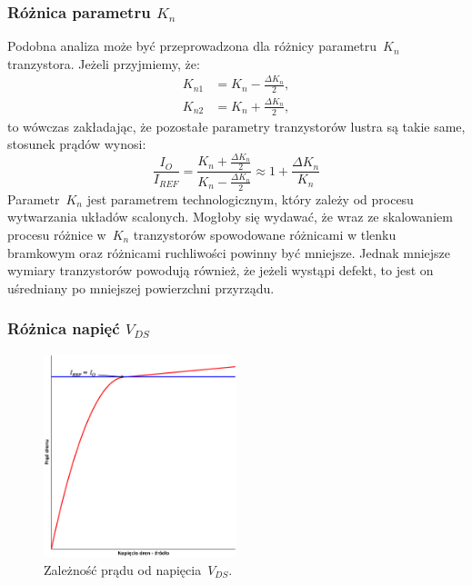 \documentclass[twoside,pl,final]{labman}
\begin{document}
\subsubsection{Różnica parametru $K_n$}
\label{baisc:matching:kp}
Podobna analiza może być przeprowadzona dla różnicy parametru~$K_n$ tranzystora.
Jeżeli przyjmiemy, że:
\begin{align}
  K_{n1} &= K_n - \frac{\Delta K_n}{2}, \nonumber \\
  K_{n2} &= K_n + \frac{\Delta K_n}{2},
\end{align}
to wówczas zakładając, że pozostałe parametry tranzystorów lustra
są takie same, stosunek prądów wynosi:
\begin{equation}
  \frac{I_O}{I_{REF}} = \frac{K_n + \frac{\Delta K_n}{2}}
    {K_n - \frac{\Delta K_n}{2}} \approx
    1 + \frac{\Delta K_n}{K_n}
  \label{eqn:matching:kp}
\end{equation}
Parametr~$K_n$ jest parametrem technologicznym,
który zależy od procesu wytwarzania układów scalonych.
Mogłoby się wydawać, że wraz ze skalowaniem procesu różnice w~$K_n$
tranzystorów spowodowane różnicami w tlenku bramkowym oraz
różnicami ruchliwości powinny być mniejsze.
Jednak mniejsze wymiary tranzystorów powodują również,
że jeżeli wystąpi defekt, to jest on uśredniany
po mniejszej powierzchni przyrządu.

\subsubsection{Różnica napięć $V_{DS}$}
\label{matching:vds}

\begin{figure}[!htbp]
  \centering
  \includegraphics[width=0.5\textwidth]{matching_vds}
  \caption{Zależność prądu od napięcia~$V_{DS}$.}
  \label{fig:matching:vds}
\end{figure}
\end{document}
